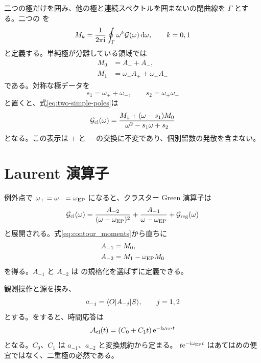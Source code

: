 二つの極だけを囲み、他の極と連続スペクトルを囲まないの閉曲線を
$\Gamma$ とする。二つの  を
\begin{equation}
M_k
=
\frac{1}{2\pi\mathrm{i}}
\oint_\Gamma
\omega^k\mathcal{G}(\omega)\,\mathrm{d}\omega,
\qquad
k=0,1
\label{eq:contour_moments}
\end{equation}
と定義する。単純極が分離している領域では
\begin{align}
M_0
&=
A_++A_- ,
\label{eq:ep-moment-zero}
\\
M_1
&=
\omega_+A_+
+\omega_-A_-
\label{eq:ep-moment-one}
\end{align}
である。対称な極データを
\begin{equation}
s_1=\omega_++\omega_- ,
\qquad
s_2=\omega_+\omega_-
\end{equation}
と置くと、式\eqref{eq:two-simple-poles}は
\begin{equation}
\mathcal{G}_{\mathrm{cl}}(\omega)
=
\frac{
M_1+(\omega-s_1)M_0
}{
\omega^2-s_1\omega+s_2
}
\label{eq:pair-resolvent-moments}
\end{equation}
となる。この表示は $+$ と $-$ の交換に不変であり、個別留数の発散を含まない。

\section{Laurent 演算子}

例外点で $\omega_+=\omega_-=\omega_{\mathrm{EP}}$ になると、クラスター Green 演算子は
\begin{equation}
\mathcal{G}_{\mathrm{cl}}(\omega)
=
\frac{A_{-2}}{(\omega-\omega_{\mathrm{EP}})^2}
+\frac{A_{-1}}{\omega-\omega_{\mathrm{EP}}}
+\mathcal{G}_{\mathrm{reg}}(\omega)
\label{eq:ep-laurent}
\end{equation}
と展開される。式\eqref{eq:contour_moments}から直ちに
\begin{align}
A_{-1}
&=
M_0,
\label{eq:ep-a-minus-one}
\\
A_{-2}
&=
M_1-\omega_{\mathrm{EP}} M_0
\label{eq:ep-a-minus-two}
\end{align}
を得る。$A_{-1}$ と $A_{-2}$ は の規格化を選ばずに定義できる。

観測操作と源を挟み、
\begin{equation}
a_{-j}
=
\langle O \rvert A_{-j}\lvert S \rangle,
\qquad
j=1,2
\end{equation}
とする。をすると、時間応答は
\begin{equation}
\mathcal{A}_{\mathrm{cl}}(t)
=
\left(C_0+C_1t\right)
\mathrm{e}^{-\mathrm{i}\omega_{\mathrm{EP}} t}
\label{eq:ep-time-response}
\end{equation}
となる。$C_0$、$C_1$ は $a_{-1}$、$a_{-2}$ と変換規約から定まる。
$t\mathrm{e}^{-\mathrm{i}\omega_{\mathrm{EP}} t}$ はあてはめの便宜ではなく、二重極の必然である。

